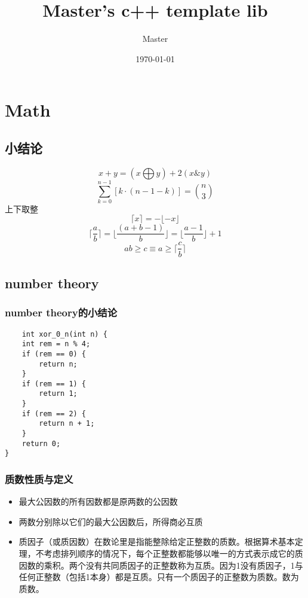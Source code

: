 \documentclass[UTF8]{ctexart}
\title{Master's c++ template lib}
\author{Master}
\date{\today}
\begin{document}
\begin{titlepage}
    \maketitle
\end{titlepage}
\tableofcontents
\section{Math}
\subsection{小结论}
\[
x+y= ( x\bigoplus y ) + 2 ( x \& y )
\]
\[
\sum_{k=0}^{n-1} \left[ k \cdot (n-1-k) \right] = \binom{n}{3}
\]
上下取整
\[
\lceil x \rceil = - \lfloor - x \rfloor
\]
\[
\lceil \frac{a}{b} \rceil =\lfloor \frac{(a+b-1)}{b} \rfloor = \lfloor \frac{a-1}{b} \rfloor +1
\]
\[
ab\ge c \equiv a\ge \lceil \frac{c}{b} \rceil
\]
\subsection{number theory}
\subsubsection{number theory的小结论}
\begin{lstlisting}
    int xor_0_n(int n) {
    int rem = n % 4;
    if (rem == 0) {
        return n;
    }
    if (rem == 1) {
        return 1;
    }
    if (rem == 2) {
        return n + 1;
    }
    return 0;
}
\end{lstlisting}
\subsubsection{质数性质与定义}
\begin{itemize}
    \item 最大公因数的所有因数都是原两数的公因数
    \item 两数分别除以它们的最大公因数后，所得商必互质
    \item 质因子（或质因数）在数论里是指能整除给定正整数的质数。根据算术基本定理，不考虑排列顺序的情况下，每个正整数都能够以唯一的方式表示成它的质因数的乘积。两个没有共同质因子的正整数称为互质。因为1没有质因子，1与任何正整数（包括1本身）都是互质。只有一个质因子的正整数为质数。数为质数。
\end{itemize}
\end{document}
